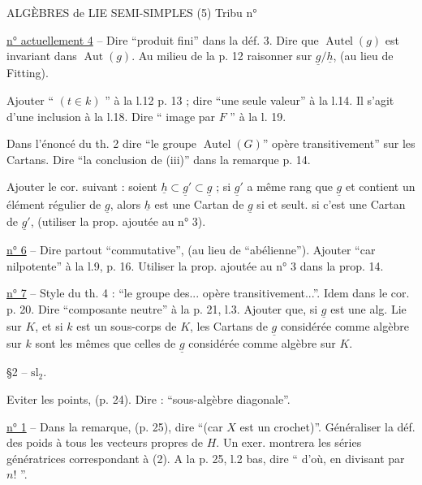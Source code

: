 
ALGÈBRES de LIE SEMI-SIMPLES (5) \hfill Tribu n° 

\uline{n° actuellement 4} -- Dire ``produit fini'' dans la déf. 3. Dire que $\operatorname{Autel}(g)$ est invariant dans $\operatorname{Aut}(g)$. Au milieu de la p. 12 raisonner sur $\underline{g}/\underline{h}$, (au lieu de Fitting).

Ajouter `` $(t\in k)$ '' à la l.12 p. 13 ; dire ``une seule valeur'' à la l.14. Il s'agit d'une inclusion à la l.18. Dire `` image par $F$ '' à la l. 19.

Dans l'énoncé du th. 2 dire ``le groupe $\operatorname{Autel}(G)$'' opère transitivement'' sur les Cartans. Dire ``la conclusion de (iii)'' dans la remarque p. 14.

Ajouter le cor. suivant : soient $\underline{h}\subset\underline{g}'\subset\underline{g}$ ; si $\underline{g}'$ a même rang que $\underline{g}$ et contient un élément régulier de $\underline{g}$, alors $\underline{h}$ est une Cartan de $\underline{g}$ si et seult. si c'est une Cartan de $\underline{g}'$, (utiliser la prop. ajoutée au n° 3).

\uline{n° 6} -- Dire partout ``commutative'', (au lieu de ``abélienne''). Ajouter ``car nilpotente'' à la l.9, p. 16. Utiliser la prop. ajoutée au n° 3 dans la prop. 14.

\uline{n° 7} -- Style du th. 4 : ``le groupe des... opère transitivement...''. Idem dans le cor. p. 20. Dire ``composante neutre'' à la p. 21, l.3. Ajouter que, si $\underline{g}$ est une alg. Lie sur $K$, et si $k$ est un sous-corps de $K$, les Cartans de $\underline{g}$ considérée comme algèbre sur $k$ sont les mêmes que celles de $\underline{g}$ considérée comme algèbre sur $K$.

§2 --  $\mathrm{sl}_2$.

Eviter les points, (p. 24). Dire : ``sous-algèbre diagonale''.

\uline{n° 1} -- Dans la remarque, (p. 25), dire ``(car $X$ est un crochet)''. Généraliser la déf. des poids à tous les vecteurs propres de $H$. Un exer. montrera les séries génératrices correspondant à (2). A la p. 25, l.2 bas, dire `` d'où, en divisant par $n!$ ''.
